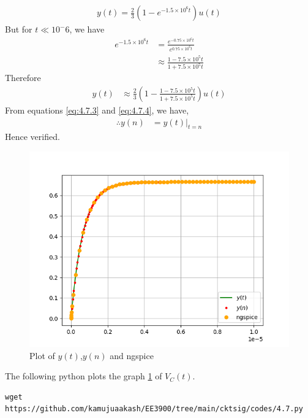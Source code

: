 \documentclass[journal,12pt,twocolumn]{IEEEtran}
\providecommand{\brak}[1]{\ensuremath{\left(#1\right)}}
\numberwithin{equation}{section}
\renewcommand\thesection{\arabic{section}}
\begin{document}
\begin{enumerate}[label=\thesection.\arabic*.,ref=\thesection.\theenumi]
\begin{align}
	y(t) = \frac{2}{3}\brak{1 - e^{-1.5\times10^6t}}u(t)
\end{align}
But for $t \ll 10^-6$, we have
\begin{align}
	e^{-1.5\times 10^6 t} &= \frac{e^{-0.75 \times 10^6 t}}{e^{0.75 \times 10^6 t}} \\
	&\approx \frac{1-7.5\times10^5t}{1+7.5\times10^5t}  
\end{align}
Therefore
\begin{align}
	\label{eq:4.7.4}
	y(t) &\approx \frac{2}{3} \brak{1 - \frac{1-7.5\times10^5t}{1+7.5\times10^5t}} u(t) 
\end{align}
From equations \eqref{eq:4.7.3} and \eqref{eq:4.7.4}, we have,
\begin{align}
	\therefore y(n) &= y(t)|_{t=n}
\end{align}
Hence verified.
\begin{figure}[!ht]
	\centering
	\includegraphics[width=\columnwidth]{./figs/4.7.png}
	\caption{Plot of $y(t)$,$y(n)$ and ngspice}
	\label{fig:4.7}	
\end{figure}
The following python plots the graph \ref{fig:4.7} of $V_C(t)$.
\begin{lstlisting}
wget https://github.com/kamujuaakash/EE3900/tree/main/cktsig/codes/4.7.py
\end{lstlisting}

\end{enumerate}
\end{document}
